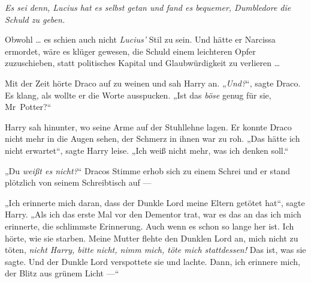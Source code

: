 \emph{Es sei denn, Lucius hat es selbst getan und fand es bequemer, Dumbledore die Schuld zu geben.}

Obwohl … es schien auch nicht \emph{Lucius’} Stil zu sein. Und hätte er Narcissa ermordet, wäre es klüger gewesen, die Schuld einem leichteren Opfer zuzuschieben, statt politisches Kapital und Glaubwürdigkeit zu verlieren …

Mit der Zeit hörte Draco auf zu weinen und sah Harry an.
„\emph{Und?}“, sagte Draco. Es klang, als wollte er die Worte ausspucken.
„Ist das \emph{böse} genug für sie, Mr~Potter?“

Harry sah hinunter, wo seine Arme auf der Stuhllehne lagen. Er konnte Draco nicht mehr in die Augen sehen, der Schmerz in ihnen war zu roh.
„Das hätte ich nicht erwartet“, sagte Harry leise.
„Ich weiß nicht mehr, was ich denken soll.“

„Du \emph{weißt es nicht?}“ Dracos Stimme erhob sich zu einem Schrei und er stand plötzlich von seinem Schreibtisch auf —

„Ich erinnerte mich daran, dass der Dunkle Lord meine Eltern getötet hat“, sagte Harry.
„Als ich das erste Mal vor den Dementor trat, war es das an das ich mich erinnerte, die schlimmste Erinnerung. Auch wenn es schon so lange her ist. Ich hörte, wie sie starben. Meine Mutter flehte den Dunklen Lord an, mich nicht zu töten, \emph{nicht Harry, bitte nicht, nimm mich, töte mich stattdessen!} Das ist, was sie sagte. Und der Dunkle Lord verspottete sie und lachte. Dann, ich erinnere mich, der Blitz aus grünem Licht —“

